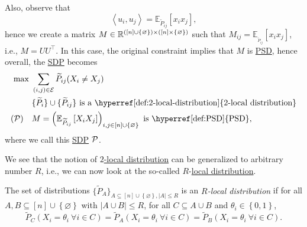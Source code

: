 Also, observe that
\[
	\left\langle u_i, u_j \right\rangle = \mathbb{E}_{\widetilde{P} _{ij}}\left[ x_i x_j\right],
\]
hence we create a matrix \(M\in \mathbb{\MakeUppercase{r}} ^{([n] \cup \left\{ \varnothing  \right\} )\times ([n] \times \left\{ \varnothing  \right\} )}\) such that \(M_{ij} = \mathbb{E}_{_{\widetilde{P} _{ij}}}\left[ x_i x_j\right] \), i.e., \(M = U U ^{\top} \). In this case, the original constraint implies that \(M\) is \hyperref[def:PSD]{PSD}, hence overall, the \hyperref[def:SDP]{SDP} becomes
\[
	\begin{aligned}
		\max~                               & \sum_{(i, j)\in \mathcal{\MakeUppercase{e}} } \widetilde{P} _{ij} (X_i \neq X_j)                                                                              \\
		                                    & \{\widetilde{P} _i\}\cup \{\widetilde{P} _{ij}\}\text{ is a \hyperref[def:2-local-distribution]{\(2\)-local distribution}}                                    \\
		(\mathcal{\MakeUppercase{p}} )\quad & M = \left( \mathbb{E}_{\widetilde{P} _{ij}}\left[X_i X_j \right] \right) _{i, j\in [n]\cup \left\{ \varnothing  \right\} }\text{ is \hyperref[def:PSD]{PSD}},
	\end{aligned}
\]
where we call this \hyperref[def:SDP]{SDP} \(\mathcal{\MakeUppercase{p}} \).

We see that the notion of \hyperref[def:2-local-distribution]{\(2\)-local distribution} can be generalized to arbitrary number \(R\), i.e., we can now look at the so-called \(R\)-\hyperref[def:local-distribution]{local distribution}.

\begin{definition}\label{def:local-distribution}
	The set of distributions \(\{ \widetilde{P} _A \}_{A \subseteq [n] \cup \left\{ \varnothing  \right\}, \left\vert A \right\vert \leq R} \) is an \emph{\(R\)-local distribution} if for all \(A, B \subseteq [n]\cup \left\{ \varnothing  \right\} \) with \(\left\vert A \cup B \right\vert \leq R\), for all \(C \subseteq A \cup B\) and \(\theta _i \in \left\{ 0, 1 \right\} \),
	\[
		\widetilde{P} _C (X_i = \theta _i\ \forall i\in C)
		= \widetilde{P} _A (X_i = \theta _i\ \forall i\in C)
		= \widetilde{P} _B (X_i = \theta _i\ \forall i\in C).
	\]
\end{definition}

